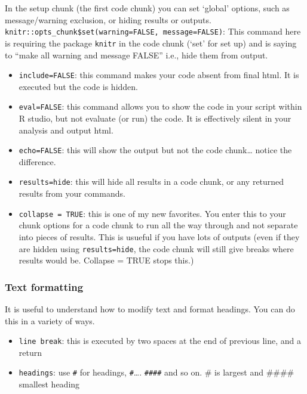 \documentclass[
]{article}
\begin{document}
In the setup chunk (the first code chunk) you can set `global' options,
such as message/warning exclusion, or hiding results or outputs.\\
\texttt{knitr::opts\_chunk\$set(warning=FALSE,\ message=FALSE)}: This
command here is requiring the package \texttt{knitr} in the code chunk
(`set' for set up) and is saying to ``make all warning and message
FALSE'' i.e., hide them from output.

\begin{itemize}
\item
  \texttt{include=FALSE}: this command makes your code absent from final
  html. It is executed but the code is hidden.
\item
  \texttt{eval=FALSE}: this command allows you to show the code in your
  script within R studio, but not evaluate (or run) the code. It is
  effectively silent in your analysis and output html.
\item
  \texttt{echo=FALSE}: this will show the output but not the code
  chunk\ldots{} notice the difference.
\item
  \texttt{results=\textquotesingle{}hide\textquotesingle{}}: this will
  hide all results in a code chunk, or any returned results from your
  commands.
\item
  \texttt{collapse\ =\ TRUE}: this is one of my new favorites. You enter
  this to your chunk options for a code chunk to run all the way through
  and not separate into pieces of results. This is usueful if you have
  lots of outputs (even if they are hidden using
  \texttt{results=\textquotesingle{}hide\textquotesingle{}}, the code
  chunk will still give breaks where results would be. Collapse = TRUE
  stops this.)
\end{itemize}

\hypertarget{text-formatting}{%
\subsubsection{Text formatting}\label{text-formatting}}

It is useful to understand how to modify text and format headings. You
can do this in a variety of ways.

\begin{itemize}
\item
  \texttt{line\ break}: this is executed by two spaces at the end of
  previous line, and a return
\item
  \texttt{headings}: use \texttt{\#} for headings, \texttt{\#}\ldots.
  \texttt{\#\#\#\#} and so on. \# is largest and \#\#\#\# smallest
  heading
\end{itemize}
\end{document}
